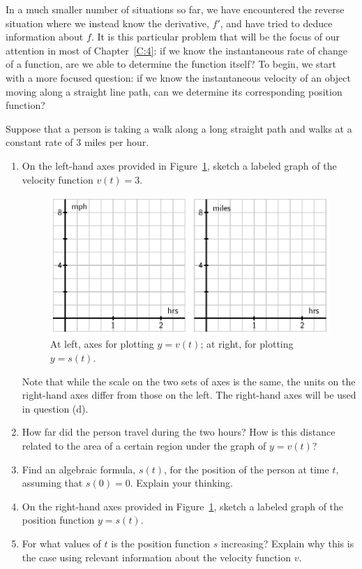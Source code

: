 In a much smaller number of situations so far, we have encountered the reverse situation where we instead know the derivative, $f'$, and have tried to deduce information about $f$.  It is this particular problem that will be the focus of our attention in most of Chapter~\ref{C:4}: if we know the instantaneous rate of change of a function, are we able to determine the function itself?  To begin, we start with a more focused question:  if we know the instantaneous velocity of an object moving along a straight line path, can we determine its corresponding position function? 

\begin{pa} \label{PA:4.1}
Suppose that a person is taking a walk along a long straight path and walks at a constant rate of 3 miles per hour.
\begin{enumerate}
	\item On the left-hand axes provided in Figure~\ref{F:4.1.PA1}, sketch a labeled graph of the velocity function $v(t) = 3$.  
\begin{figure}[h]
\begin{center}
\includegraphics{figures/4_1_PA1.eps}
\caption{At left, axes for plotting $y = v(t)$; at right, for plotting $y = s(t)$.} \label{F:4.1.PA1}
\end{center}
\end{figure}
Note that while the scale on the two sets of axes is the same, the units on the right-hand axes differ from those on the left.  The right-hand axes will be used in question (d).
	\item How far did the person travel during the two hours?  How is this distance related to the area of a certain region under the graph of $y = v(t)$?
	\item Find an algebraic formula, $s(t)$, for the position of the person at time $t$, assuming that $s(0) = 0$.  Explain your thinking.
	\item On the right-hand axes provided in Figure~\ref{F:4.1.PA1}, sketch a labeled graph of the position function $y = s(t)$.
	\item For what values of $t$ is the position function $s$ increasing?  Explain why this is the case using relevant information about the velocity function $v$.
\end{enumerate}
\end{pa} 
\afterpa

